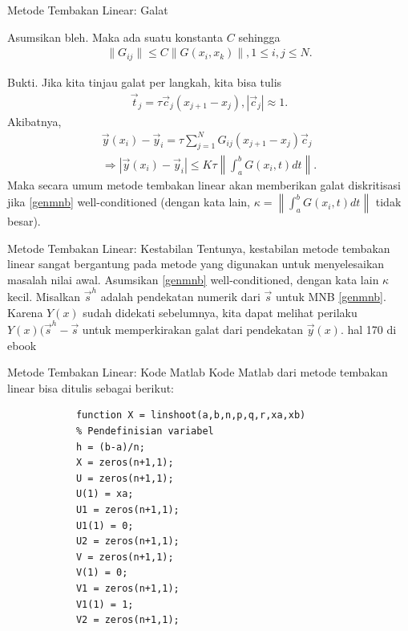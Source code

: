 \documentclass[xcolor={dvipsnames}, 9pt]{beamer}
\begin{document}
	\begin{frame}{Metode Tembakan Linear: Galat}
		\begin{theorem}
			Asumsikan bleh. Maka ada suatu konstanta $C$ sehingga
			\begin{align*}
				\|G_{ij}\| \leq C \|G(x_i,x_k)\|, 1\leq i,j \leq N.
			\end{align*}
		\end{theorem}
		Bukti. \newline 
		Jika kita tinjau galat per langkah, kita bisa tulis
		\begin{align*}
			\vec{t}_j = \tau \vec{c}_j(x_{j+1}-x_j), |\vec{c}_j| \approx 1.
		\end{align*}
		Akibatnya,
		\begin{gather*}
			\vec{y}(x_i) - \vec{y}_i = \tau \sum_{j=1}^{N}G_{ij}(x_{j+1}-x_j)\vec{c}_j \\
			\Rightarrow |\vec{y}(x_i) - \vec{y}_i| \leq K\tau \left\|\int_a^b G(x_i,t) dt\right\|.
		\end{gather*}
		Maka secara umum metode tembakan linear akan memberikan galat diskritisasi jika \eqref{genmnb} well-conditioned (dengan kata lain, $\kappa = \left\|\int_a^b G(x_i,t) dt\right\|$ tidak besar).
	\end{frame}
	\begin{frame}{Metode Tembakan Linear: Kestabilan}
		Tentunya, kestabilan metode tembakan linear sangat bergantung pada metode yang digunakan untuk menyelesaikan masalah nilai awal. Asumsikan \eqref{genmnb} well-conditioned, dengan kata lain $\kappa$ kecil. \newline
		Misalkan $\vec{s}^h$ adalah pendekatan numerik dari $\vec{s}$ untuk MNB \eqref{genmnb}. Karena $Y(x)$ sudah didekati sebelumnya, kita dapat melihat perilaku $Y(x)(\vec{s}^h-\vec{s}$ untuk memperkirakan galat dari pendekatan $\vec{y}(x)$. hal 170 di ebook
	\end{frame}
	\begin{frame}[fragile]{Metode Tembakan Linear: Kode Matlab}
		Kode Matlab dari metode tembakan linear bisa ditulis sebagai berikut:
		\begin{verbatim}
			function X = linshoot(a,b,n,p,q,r,xa,xb)
			% Pendefinisian variabel
			h = (b-a)/n;
			X = zeros(n+1,1);
			U = zeros(n+1,1);
			U(1) = xa;
			U1 = zeros(n+1,1);
			U1(1) = 0;
			U2 = zeros(n+1,1);
			V = zeros(n+1,1);
			V(1) = 0;
			V1 = zeros(n+1,1);
			V1(1) = 1;
			V2 = zeros(n+1,1);
		\end{verbatim}
	\end{frame}
\end{document}
